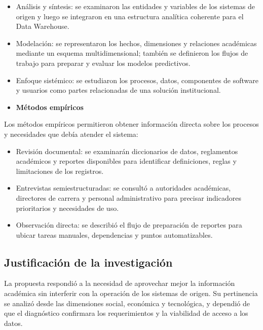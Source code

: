 \documentclass[11pt,oneside,openany]{book}
\begin{document}
\begin{itemize}[leftmargin=*]
\item Análisis y síntesis: se examinaron las entidades y variables de los sistemas de origen y luego se integraron en una estructura analítica coherente para el Data Warehouse.
\item Modelación: se representaron los hechos, dimensiones y relaciones académicas mediante un esquema multidimensional; también se definieron los flujos de trabajo para preparar y evaluar los modelos predictivos.
\item Enfoque sistémico: se estudiaron los procesos, datos, componentes de software y usuarios como partes relacionadas de una solución institucional.
\item \textbf{Métodos empíricos}
\end{itemize}
Los métodos empíricos permitieron obtener información directa sobre los procesos y necesidades que debía atender el sistema:

\begin{itemize}[leftmargin=*]
\item Revisión documental: se examinarán diccionarios de datos, reglamentos académicos y reportes disponibles para identificar definiciones, reglas y limitaciones de los registros.
\item Entrevistas semiestructuradas: se consultó a autoridades académicas, directores de carrera y personal administrativo para precisar indicadores prioritarios y necesidades de uso.
\item Observación directa: se describió el flujo de preparación de reportes para ubicar tareas manuales, dependencias y puntos automatizables.
\end{itemize}
\subsection*{Justificación de la investigación}

La propuesta respondió a la necesidad de aprovechar mejor la información académica sin interferir con la operación de los sistemas de origen. Su pertinencia se analizó desde las dimensiones social, económica y tecnológica, y dependió de que el diagnóstico confirmara los requerimientos y la viabilidad de acceso a los datos.
\end{document}
